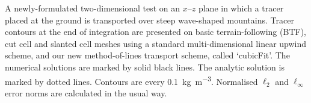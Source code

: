 \documentclass{article}
\begin{document}
A newly-formulated two-dimensional test on an $x$--$z$ plane in which a tracer placed at the ground is transported over steep wave-shaped mountains.  Tracer contours at the end of integration are presented on basic terrain-following (BTF), cut cell and slanted cell meshes using a standard multi-dimensional linear upwind scheme, and our new method-of-lines transport scheme, called `cubicFit'.
The numerical solutions are marked by solid black lines.  The analytic solution is marked by dotted lines.  Contours are every \SI{0.1}{\kilo\gram\per\meter\cubed}.  Normalised $\ell_2$ and $\ell_\infty$ error norms are calculated in the usual way.
\end{document}
